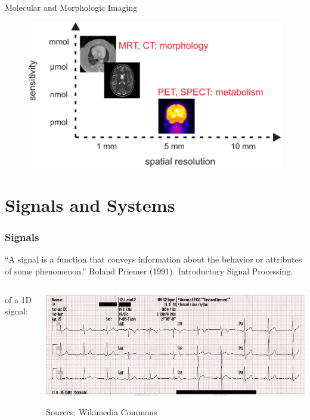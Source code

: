 \begin{frame}[c]{Molecular and Morphologic Imaging}
    \begin{figure}
        \includegraphics[width=.8\linewidth]{../00_motivation/Bilder/moletab.pdf}
    \end{figure}
\end{frame}




\section{Signals and Systems} %


\begin{frame}

    \frametitle{Signals}
    \begin{myDefinition}
        ``A signal is a function that conveys information about the behavior or attributes of some phenomenon.''\quad
        {\scriptsize
            Roland Priemer (1991). Introductory Signal Processing.
        }
    \end{myDefinition}
    \begin{columns}[c, onlytextwidth]
        \begin{column}{0.4\textwidth}
            \myExample{} of a 1D signal:
        \end{column}\begin{column}{0.6\textwidth}
            \includegraphics[height=.45\textheight ]{images/ecg}
            \begin{flushright}
                \scriptsize Sources: Wikimedia Commons
            \end{flushright}
        \end{column}
    \end{columns}

\end{frame}


